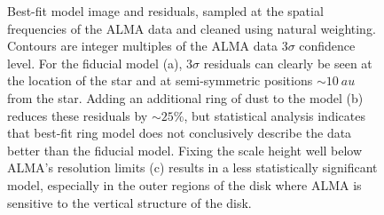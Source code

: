 \documentclass[modern]{aastex62}
\begin{document}
\begin{figure}
  \centering
  
  \qquad
    
  \qquad

  \qquad
    
  \caption{Best-fit model image and residuals, sampled at the spatial frequencies of the ALMA data and cleaned using natural weighting. 
  Contours are integer multiples of the ALMA data $3\sigma$ confidence level. 
  For the fiducial model (a), $3\sigma$ residuals can clearly be seen at the location of the star and at semi-symmetric positions $\sim \SI{10}{au}$ from the star. 
  Adding an additional ring of dust to the model (b) reduces these residuals by $\sim 25 \%$, but statistical analysis indicates that best-fit ring model does not conclusively describe the data better than the fiducial model.
  Fixing the scale height well below ALMA's resolution limits (c) results in a less statistically significant model, especially in the outer regions of the disk where ALMA is sensitive to the vertical structure of the disk.}
\end{figure}
\end{document}
